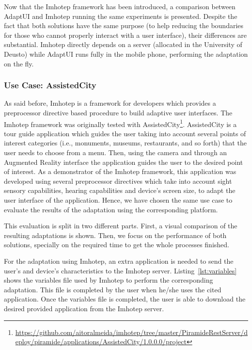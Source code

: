 Now that the Imhotep framework has been introduced, a comparison between AdaptUI and
Imhotep running the same experiments is presented. Despite the fact that both solutions
have the same purpose (to help reducing the boundaries for those who cannot
properly interact with a user interface), their differences are substantial.
Imhotep directly depends on a server (allocated in the University of Deusto)
while AdaptUI runs fully in the mobile phone, performing the adaptation on the
fly. 

\subsubsection{Use Case: AssistedCity}
\label{sec:assisted_city_use_case}

As said before, Imhotep is a framework for developers which provides a 
preprocessor directive based procedure to build adaptive user interfaces. The 
Imhotep framework was originally tested with AssistedCity\footnote{\url{
https://github.com/aitoralmeida/imhotep/tree/master/PiramideRestServer/deploy/piramide/applications/AssistedCity/1.0.0.0/project}}. 
AssistedCity is a tour 
guide application which guides the user taking into account several points of interest 
categories (i.e., monuments, museums, restaurants, and so forth) that the user 
needs to choose from a menu. Then, using the camera and through an Augmented 
Reality interface the application guides the user to the desired point of 
interest. As a demonstrator of the Imhotep framework, this application was 
developed using several preprocessor directives which take into account sight 
sensory capabilities, hearing capabilities and device's screen size, to adapt 
the user interface of the application. Hence, we have chosen the same use case to 
evaluate the results of the adaptation using the corresponding platform.

This evaluation is split in two different parts. First, a visual comparison of
the resulting adaptations is shown. Then, we focus on the performance of both
solutions, specially on the required time to get the whole processes finished.

For the adaptation using Imhotep, an extra application is needed to send the 
user's and device's characteristics to the Imhotep server. 
Listing~\ref{lst:variables} shows the variables file used by Imhotep to perform
the corresponding adaptation. This file is completed by the user when he/she 
uses the cited application. Once the variables file is completed, the user is 
able to download the desired provided application from the Imhotep server.


